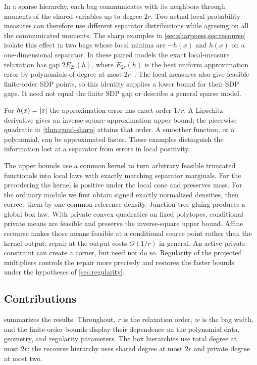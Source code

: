 In a sparse hierarchy, each bag communicates with its neighbors through
moments of the shared variables up to degree $2r$. Two actual local
probability measures can therefore use different separator distributions
while agreeing on all the communicated moments. The sharp examples in
\cref{sec:sharpness,sec:recourse} isolate this effect in two bags whose local
minima are $-h(x)$ and $h(x)$ on a one-dimensional separator. In these
paired models the exact local-measure relaxation has gap $2E_{2r}(h)$,
where $E_{2r}(h)$ is the best uniform approximation error by polynomials of
degree at most $2r$~\cite{han2018-local-moment-matching}. The local measures
also give feasible finite-order SDP points, so this identity supplies a
lower bound for their SDP gaps. It need not equal the finite SDP gap or
describe a general sparse model.

For $h(x)=\lvert x\rvert$ the approximation error has exact order $1/r$.
A Lipschitz derivative gives an inverse-square approximation upper bound;
the piecewise quadratic in \cref{thm:quad-sharp} attains that order. A
smoother function, or a polynomial, can be approximated faster. These
examples distinguish the information lost at a separator from errors in
local positivity.

The upper bounds use a common kernel to turn arbitrary feasible truncated
functionals into local laws with exactly matching separator marginals.
For the preordering the kernel is positive under the local cone and
preserves mass. For the ordinary module we first obtain signed exactly
normalized densities, then correct them by one common reference density.
Junction-tree gluing produces a global box law. With private convex
quadratics on fixed polytopes, conditional private means are feasible and
preserve the inverse-square upper bound. Affine recourse makes those means
feasible at a conditional source point rather than the kernel output;
repair at the output costs $O(1/r)$ in general. An active private constraint
can create a corner, but need not do so. Regularity of the projected
multipliers controls the repair more precisely and restores the faster
bounds under the hypotheses of \cref{sec:regularity}.

\subsection{Contributions}\label{sec:intro-contributions}

 summarizes the results. Throughout, $r$ is the
relaxation order, $w$ is the bag width, and the finite-order bounds display
their dependence on the polynomial data, geometry, and regularity parameters.
The box hierarchies use total degree at most $2r$; the recourse hierarchy
uses shared degree at most $2r$ and private degree at most two.

